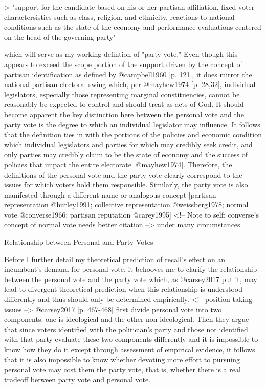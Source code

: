 \documentclass[hyphens, crop=false]{standalone}
\begin{document}
	> "support for the candidate based on his or her partisan affiliation, fixed voter charactersistics such as class, religion, and ethnicity, reactions to national conditions such as the state of the economy and performance evaluations centered on the head of the governing party"
	
		which will serve as my working defintion of "party vote." Even though this appears to exceed the scope portion of the support driven by the concept of partisan identification as defined by @campbell1960 [p. 121],
		it does mirror the national partisan electoral swing which,
		per @mayhew1974 [p. 28,32],
		individual legislators,
		especially those representing marginal constituencies,
		cannot be reasonably be expected to control and should treat as acts of God. It should become apparent the key distinction here between the personal vote and the party vote is the degree to which an individual legislator may influence. It follows that the definition ties in with the portions of the policies and economic condition which individual legislators and parties for which may credibly seek credit,
		and only parties may credibly claim to be the state of economy and the success of policies that impact the entire electorate [@mayhew1974]. Therefore,
		the definitions of the personal vote and the party vote clearly correspond to the issues for which voters hold them responsible. Similarly,
		the party vote is also manifested through a different name or analogous concept [partisan representation @hurley1991; collective representation @weissberg1978; normal vote @converse1966; partisan reputation @carey1995] <!-- Note to self: converse's concept of normal vote needs better citation --> under many circumstances.
	
		Relationship between Personal and Party Votes
	
	
		Before I further detail my theoretical prediction of recall's effect on an incumbent's demand for personal vote,
		it behooves me to clarify the relationship between the personal vote and the party vote which,
		as @carsey2017 put it,
		may lead to divergent theoretical prediction when this relationship is understood differently and thus should only be determined empirically.
		<!-- position taking issues -->
		@carsey2017 [p. 467-468] first divide personal vote into two components:
		one is ideological and the other non-ideological.
		Then they argue that since voters identified with the politician's party and those not identified with that party evaluate these two components differently
		and it is impossible to know how they do it except through assessment of empirical evidence,
		it follows that it is also impossible to know whether devoting more effort to pursuing personal vote may cost them the party vote,
		that is,
		whether there is a real tradeoff between party vote and personal vote.
	
\end{document}
